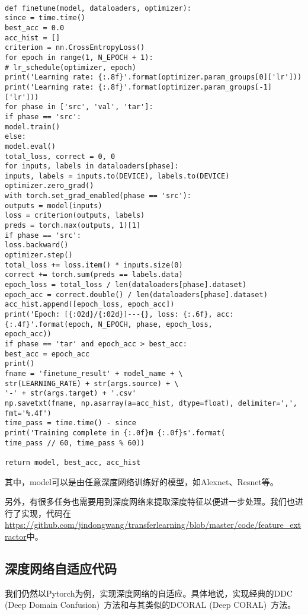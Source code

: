 \begin{lstlisting}[title=深度网络的finetune代码实现, frame=shadowbox]

def finetune(model, dataloaders, optimizer):
since = time.time()
best_acc = 0.0
acc_hist = []
criterion = nn.CrossEntropyLoss()
for epoch in range(1, N_EPOCH + 1):
# lr_schedule(optimizer, epoch)
print('Learning rate: {:.8f}'.format(optimizer.param_groups[0]['lr']))
print('Learning rate: {:.8f}'.format(optimizer.param_groups[-1]['lr']))
for phase in ['src', 'val', 'tar']:
if phase == 'src':
model.train()
else:
model.eval()
total_loss, correct = 0, 0
for inputs, labels in dataloaders[phase]:
inputs, labels = inputs.to(DEVICE), labels.to(DEVICE)
optimizer.zero_grad()
with torch.set_grad_enabled(phase == 'src'):
outputs = model(inputs)
loss = criterion(outputs, labels)
preds = torch.max(outputs, 1)[1]
if phase == 'src':
loss.backward()
optimizer.step()
total_loss += loss.item() * inputs.size(0)
correct += torch.sum(preds == labels.data)
epoch_loss = total_loss / len(dataloaders[phase].dataset)
epoch_acc = correct.double() / len(dataloaders[phase].dataset)
acc_hist.append([epoch_loss, epoch_acc])
print('Epoch: [{:02d}/{:02d}]---{}, loss: {:.6f}, acc: {:.4f}'.format(epoch, N_EPOCH, phase, epoch_loss,
epoch_acc))
if phase == 'tar' and epoch_acc > best_acc:
best_acc = epoch_acc
print()
fname = 'finetune_result' + model_name + \
str(LEARNING_RATE) + str(args.source) + \
'-' + str(args.target) + '.csv'
np.savetxt(fname, np.asarray(a=acc_hist, dtype=float), delimiter=',',
fmt='%.4f')
time_pass = time.time() - since
print('Training complete in {:.0f}m {:.0f}s'.format(
time_pass // 60, time_pass % 60))

return model, best_acc, acc_hist

\end{lstlisting}

其中，model可以是由任意深度网络训练好的模型，如Alexnet、Resnet等。

另外，有很多任务也需要用到深度网络来提取深度特征以便进一步处理。我们也进行了实现，代码在\url{https://github.com/jindongwang/transferlearning/blob/master/code/feature_extractor}中。

%
\subsection{深度网络自适应代码}

我们仍然以Pytorch为例，实现深度网络的自适应。具体地说，实现经典的DDC (Deep Domain Confusion)~\cite{tzeng2014deep}方法和与其类似的DCORAL (Deep CORAL)~\cite{sun2016deep}方法。

